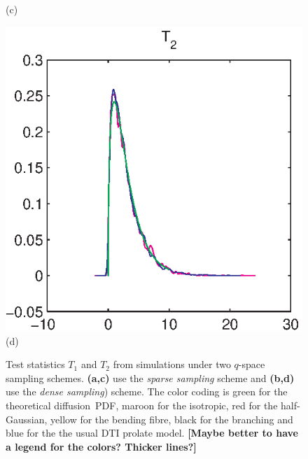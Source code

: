 \documentclass[authoryear,preprint,12pt]{elsarticle}
\begin{document}
\begin{figure}[tbp]
\begin{center}
\begin{minipage}[]{0.45\textwidth}
      (c)
    \end{minipage}
    \begin{minipage}[]{0.45\textwidth}
      \centering
      \includegraphics[width=\textwidth]{mrmcomplex15nyhighden.eps}
      (d)
    \end{minipage}
  \end{center}
  \caption{Test statistics $T_1$ and $T_2$ from simulations under two
    $q$-space sampling schemes.  \textbf{(a,c)} use the \textit{sparse
      sampling} scheme and \textbf{(b,d)} use the \textit{dense
      sampling}) scheme.  The color coding is green for the
    theoretical diffusion~PDF, maroon for the isotropic, red for the
    half-Gaussian, yellow for the bending fibre, black for the
    branching and blue for the the usual DTI prolate model.
    \textbf{[Maybe better to have a legend for the colors?  Thicker
        lines?]}}
  \label{fig:T1T2}
\end{figure}
\end{document}
